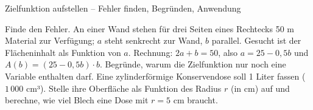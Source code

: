 \begin{aufgabe}{Zielfunktion aufstellen – Fehler finden, Begründen, Anwendung}
\begin{teile}
\teil Finde den Fehler. An einer Wand stehen für drei Seiten eines Rechtecks 50 m Material zur Verfügung; $a$ steht senkrecht zur Wand, $b$ parallel. Gesucht ist der Flächeninhalt als Funktion von $a$. Rechnung: $2a + b = 50$, also $a = 25 - 0{,}5b$ und $A(b) = (25 - 0{,}5b) \cdot b$.
\teil Begründe, warum die Zielfunktion nur noch eine Variable enthalten darf.
\teil Eine zylinderförmige Konservendose soll 1 Liter fassen ($1\,000$ cm³). Stelle ihre Oberfläche als Funktion des Radius $r$ (in cm) auf und berechne, wie viel Blech eine Dose mit $r = 5$ cm braucht.
\end{teile}
\end{aufgabe}
